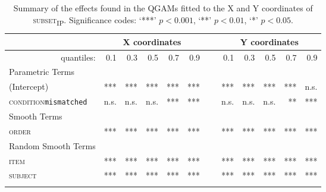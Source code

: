 \begin{table}\fontsize{9}{10}
\caption{Summary of the effects found in the QGAMs fitted to the X and Y coordinates of \textsc{subset\textsubscript{IP}}. Significance codes: `***' $p < 0.001$, `**' $p < 0.01$, `*' $p < 0.05$.}
\label{tab:8.6}
\centering
\begin{tabular}{lrrrrrrrrrrr}
\lsptoprule
~                   & \multicolumn{5}{c}{X coordinates} & \multicolumn{1}{c}{}    & \multicolumn{5}{c}{Y coordinates}                               \\
\midrule
\multicolumn{1}{r}{quantiles:}          & 0.1        & 0.3        & 0.5        & 0.7        & 0.9 & ~        & 0.1        & 0.3        & 0.5        & 0.7        & 0.9         \\
\midrule
Parametric Terms    & \textbf{~} & \textbf{~} & \textbf{~} & \textbf{~} & \textbf{~} & \textbf{~} & \textbf{~} & \textbf{~} & \textbf{~} & \textbf{~}  \\
\midrule
(Intercept)         & ***        & ***        & ***        & ***        & *** & ~        & ***        & ***        & ***        & ***        & n.s.          \\
\textsc{condition}\texttt{mismatched} & n.s.       & n.s.          & n.s.        & ***        & *** & ~        & n.s.       & n.s.        & n.s.        & **        & ***         \\
\midrule
Smooth Terms        & \textbf{~} & \textbf{~} & \textbf{~} & \textbf{~} & \textbf{~} & \textbf{~} & \textbf{~} & \textbf{~} & \textbf{~} & \textbf{~}  \\
\midrule
\textsc{order}               & ***        & ***        & ***        & ***        & *** & ~        & ***        & ***        & ***        & ***        & ***         \\
\midrule
Random Smooth Terms & \textbf{~} & \textbf{~} & \textbf{~} & \textbf{~} & \textbf{~} & \textbf{~} & \textbf{~} & \textbf{~} & \textbf{~} & \textbf{~}  \\
\midrule
\textsc{item}                & ***        & ***        & ***        & ***        & *** & ~        & ***        & ***        & ***        & ***        & ***         \\
\textsc{subject}             & ***        & ***        & ***        & ***        & *** & ~        & ***        & ***        & ***        & ***        & ***        \\
\lspbottomrule
\end{tabular}
\end{table}

